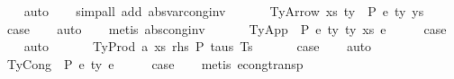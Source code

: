 \begin{isabellebody}
\ \ \isamarkupfalse%
\ auto\isanewline
\ \ \isamarkupfalse%
\ {\isacharparenleft}{\kern0pt}simp{\isacharunderscore}{\kern0pt}all\ add{\isacharcolon}{\kern0pt}\ abs{\isacharunderscore}{\kern0pt}var{\isacharunderscore}{\kern0pt}cong{\isacharunderscore}{\kern0pt}inv{\isacharparenright}{\kern0pt}\isanewline
\ \ \isamarkupfalse%
\isanewline
{}\isamarkupfalse%
\isanewline
\ \ \isamarkupfalse%
\ {\isacharparenleft}{\kern0pt}TyArrow\ xs\ ty{}\ {\isasymGamma}\ P\ e\ ty{}\ ys{\isacharparenright}{\kern0pt}\isanewline
\ \ \isamarkupfalse%
\ \isamarkupfalse%
\ {\isacharquery}{\kern0pt}case\isanewline
\ \ \isamarkupfalse%
\ auto\isanewline
\ \ \isamarkupfalse%
\ {\isacharparenleft}{\kern0pt}metis\ abs{\isacharunderscore}{\kern0pt}cong{\isacharunderscore}{\kern0pt}inv{\isacharparenright}{\kern0pt}\isanewline
\ \ \isamarkupfalse%
\isanewline
{}\isamarkupfalse%
\isanewline
\ \ \isamarkupfalse%
\ {\isacharparenleft}{\kern0pt}TyApp\ {\isasymGamma}\ P\ e{}\ ty{}\ ty{}\ xs\ e{}{\isacharparenright}{\kern0pt}\isanewline
\ \ \isamarkupfalse%
\ \isamarkupfalse%
\ {\isacharquery}{\kern0pt}case\isanewline
\ \ \isamarkupfalse%
\ auto\isanewline
\ \ \isamarkupfalse%
\isanewline
{}\isamarkupfalse%
\isanewline
\ \ \isamarkupfalse%
\ {\isacharparenleft}{\kern0pt}TyProd\ a\ xs\ rhs\ P\ taus\ Ts\ {\isasymGamma}{\isacharparenright}{\kern0pt}\isanewline
\ \ \isamarkupfalse%
\ \isamarkupfalse%
\ {\isacharquery}{\kern0pt}case\isanewline
\ \ \isamarkupfalse%
\ auto\isanewline
\ \ \isamarkupfalse%
\isanewline
{}\isamarkupfalse%
\isanewline
\ \ \isamarkupfalse%
\ {\isacharparenleft}{\kern0pt}TyCong\ {\isasymGamma}\ P\ e{}\ ty\ e{}{\isacharparenright}{\kern0pt}\isanewline
\ \ \isamarkupfalse%
\ \isamarkupfalse%
\ {\isacharquery}{\kern0pt}case\isanewline
\ \ \isamarkupfalse%
\ {\isacharparenleft}{\kern0pt}metis\ econg{\isacharunderscore}{\kern0pt}transp{\isacharparenright}{\kern0pt}\isanewline
{}\isamarkupfalse%
\isanewline
\ \ \isamarkupfalse%

\end{isabellebody}
